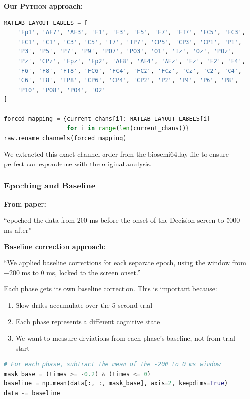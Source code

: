 \documentclass[11pt,a4paper]{article}
\newcommand{\python}{\textsc{Python}}
\begin{document}
\textbf{Our \python{} approach:}
\begin{lstlisting}[style=pythonstyle,language=Python]
MATLAB_LAYOUT_LABELS = [
    'Fp1', 'AF7', 'AF3', 'F1', 'F3', 'F5', 'F7', 'FT7', 'FC5', 'FC3',
    'FC1', 'C1', 'C3', 'C5', 'T7', 'TP7', 'CP5', 'CP3', 'CP1', 'P1',
    'P3', 'P5', 'P7', 'P9', 'PO7', 'PO3', 'O1', 'Iz', 'Oz', 'POz',
    'Pz', 'CPz', 'Fpz', 'Fp2', 'AF8', 'AF4', 'AFz', 'Fz', 'F2', 'F4',
    'F6', 'F8', 'FT8', 'FC6', 'FC4', 'FC2', 'FCz', 'Cz', 'C2', 'C4',
    'C6', 'T8', 'TP8', 'CP6', 'CP4', 'CP2', 'P2', 'P4', 'P6', 'P8',
    'P10', 'PO8', 'PO4', 'O2'
]

forced_mapping = {current_chans[i]: MATLAB_LAYOUT_LABELS[i]
                  for i in range(len(current_chans))}
raw.rename_channels(forced_mapping)
\end{lstlisting}

We extracted this exact channel order from the biosemi64.lay file to ensure perfect correspondence with the original analysis.

\subsubsection{Epoching and Baseline}

\textbf{From paper:}
\begin{paperquote}
``epoched the data from 200 ms before the onset of the Decision screen to 5000 ms after''
\end{paperquote}

\textbf{Baseline correction approach:}
\begin{paperquote}
``We applied baseline corrections for each separate epoch, using the window from $-200$ ms to 0 ms, locked to the screen onset.''
\end{paperquote}

Each phase gets its own baseline correction. This is important because:
\begin{enumerate}
    \item Slow drifts accumulate over the 5-second trial
    \item Each phase represents a different cognitive state
    \item We want to measure deviations from each phase's baseline, not from trial start
\end{enumerate}

\begin{lstlisting}[style=pythonstyle,language=Python]
# For each phase, subtract the mean of the -200 to 0 ms window
mask_base = (times >= -0.2) & (times <= 0)
baseline = np.mean(data[:, :, mask_base], axis=2, keepdims=True)
data -= baseline
\end{lstlisting}
\end{document}
